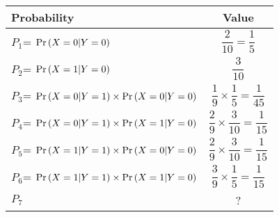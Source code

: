 \begin{tabular}{|l|c|}
	\hline
	\textbf{Probability} & \textbf{Value} \\
	\hline
    $P_1$= $\Pr\left(X=0|Y=0\right)$ & $\dfrac{2}{10}=\dfrac{1}{5}$\\ 
	\hline
	$P_2$= $\Pr\left(X=1|Y=0\right)$ & $\dfrac{3}{10}$\\ 
	\hline
	$P_3$= $\Pr\left(X=0|Y=1\right)\times\Pr\left(X=0|Y=0\right)$ & $\dfrac{1}{9}\times\dfrac{1}{5}=\dfrac{1}{45}$\\ 
	\hline
	$P_4$= $\Pr\left(X=0|Y=1\right)\times\Pr\left(X=1|Y=0\right)$ & $\dfrac{2}{9}\times\dfrac{3}{10}=\dfrac{1}{15}$\\ 
	\hline
    $P_5$= $\Pr\left(X=1|Y=1\right)\times\Pr\left(X=0|Y=0\right)$ & $\dfrac{2}{9}\times\dfrac{3}{10}=\dfrac{1}{15}$\\ 
	\hline
	$P_6$= $\Pr\left(X=1|Y=1\right)\times\Pr\left(X=1|Y=0\right)$ & $\dfrac{3}{9}\times\dfrac{1}{5}=\dfrac{1}{15}$\\ 
	\hline
	$P_7$ & ? \\ 
	\hline
\end{tabular}

